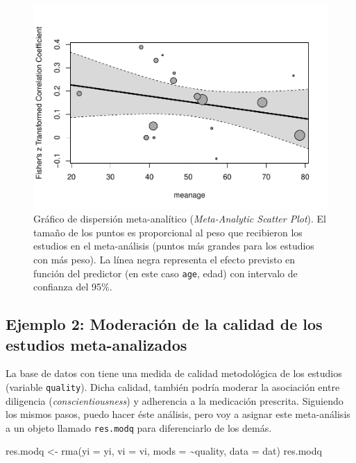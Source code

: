 \documentclass[
  bookmarksnumbered]{article}
\newenvironment{Shaded}{\begin{snugshade}}{\end{snugshade}}
\newcommand{\AttributeTok}[1]{\textcolor[rgb]{0.00,0.34,0.68}{#1}}
\newcommand{\FunctionTok}[1]{\textcolor[rgb]{0.39,0.29,0.61}{#1}}
\newcommand{\NormalTok}[1]{\textcolor[rgb]{0.12,0.11,0.11}{#1}}
\newcommand{\OtherTok}[1]{\textcolor[rgb]{0.00,0.43,0.16}{#1}}
\newcommand{\SpecialCharTok}[1]{\textcolor[rgb]{0.24,0.68,0.91}{#1}}
\begin{document}
\begin{figure}
\centering
\includegraphics{Meta-analysis_files/figure-latex/reg-plot-1.pdf}
\caption{\label{fig:reg-plot}Gráfico de dispersión meta-analítico (\emph{Meta-Analytic Scatter Plot}). El tamaño de los puntos es proporcional al peso que recibieron los estudios en el meta-análisis (puntos más grandes para los estudios con más peso). La línea negra representa el efecto previsto en función del predictor (en este caso \texttt{age}, edad) con intervalo de confianza del 95\%.}
\end{figure}

\hypertarget{ejemplo-2-moderaciuxf3n-de-la-calidad-de-los-estudios-meta-analizados}{%
\subsection{Ejemplo 2: Moderación de la calidad de los estudios meta-analizados}\label{ejemplo-2-moderaciuxf3n-de-la-calidad-de-los-estudios-meta-analizados}}

La base de datos con tiene una medida de calidad metodológica de los estudios (variable \texttt{quality}). Dicha calidad, también podría moderar la asociación entre diligencia (\emph{conscientiousness}) y adherencia a la medicación prescrita. Siguiendo los mismos pasos, puedo hacer éste análisis, pero voy a asignar este meta-análisis a un objeto llamado \texttt{res.modq} para diferenciarlo de los demás.

\begin{Shaded}
\begin{Highlighting}[]
\NormalTok{res.modq }\OtherTok{\textless{}{-}} \FunctionTok{rma}\NormalTok{(}\AttributeTok{yi =}\NormalTok{ yi, }\AttributeTok{vi =}\NormalTok{ vi, }\AttributeTok{mods =} \SpecialCharTok{\textasciitilde{}}\NormalTok{quality, }\AttributeTok{data =}\NormalTok{ dat)}
\NormalTok{res.modq}
\end{Highlighting}
\end{Shaded}
\end{document}
